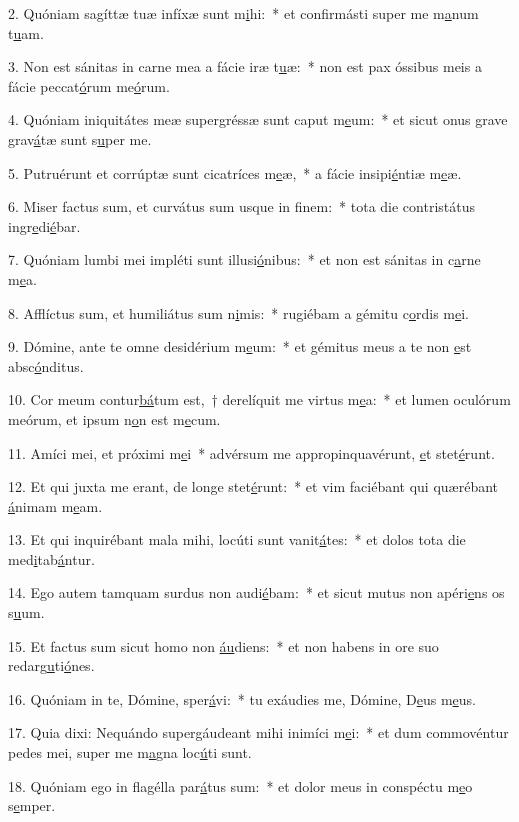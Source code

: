 2. Quóniam sagíttæ tuæ infíxæ sunt m\uline{i}hi:~* et confirmásti super me m\uline{a}num t\uline{u}am.\par 
3. Non est sánitas in carne mea a fácie iræ t\uline{u}æ:~* non est pax óssibus meis a fácie peccat\uline{ó}rum me\uline{ó}rum.\par 
4. Quóniam iniquitátes meæ supergréssæ sunt caput m\uline{e}um:~* et sicut onus grave grav\uline{á}tæ sunt s\uline{u}per me.\par 
5. Putruérunt et corrúptæ sunt cicatríces m\uline{e}æ,~* a fácie insipi\uline{é}ntiæ m\uline{e}æ.\par 
6. Miser factus sum, et curvátus sum usque in f\uline{i}nem:~* tota die contristátus ingr\uline{e}di\uline{é}bar.\par 
7. Quóniam lumbi mei impléti sunt illusi\uline{ó}nibus:~* et non est sánitas in c\uline{a}rne m\uline{e}a.\par 
8. Afflíctus sum, et humiliátus sum n\uline{i}mis:~* rugiébam a gémitu c\uline{o}rdis m\uline{e}i.\par 
9. Dómine, ante te omne desidérium m\uline{e}um:~* et gémitus meus a te non \uline{e}st absc\uline{ó}nditus.\par 
10. Cor meum contur\uline{bá}tum est,~† derelíquit me virtus m\uline{e}a:~* et lumen oculórum meórum, et ipsum n\uline{o}n est m\uline{e}cum.\par 
11. Amíci mei, et próximi m\uline{e}i~* advérsum me appropinquavérunt, \uline{e}t stet\uline{é}runt.\par 
12. Et qui juxta me erant, de longe stet\uline{é}runt:~* et vim faciébant qui quærébant \uline{á}nimam m\uline{e}am.\par 
13. Et qui inquirébant mala mihi, locúti sunt vanit\uline{á}tes:~* et dolos tota die med\uline{i}tab\uline{á}ntur.\par 
14. Ego autem tamquam surdus non audi\uline{é}bam:~* et sicut mutus non apéri\uline{e}ns os s\uline{u}um.\par 
15. Et factus sum sicut homo non \uline{áu}diens:~* et non habens in ore suo redarg\uline{u}ti\uline{ó}nes.\par 
16. Quóniam in te, Dómine, sper\uline{á}vi:~* tu exáudies me, Dómine, D\uline{e}us m\uline{e}us.\par 
17. Quia dixi: Nequándo supergáudeant mihi inimíci m\uline{e}i:~* et dum commovéntur pedes mei, super me m\uline{a}gna loc\uline{ú}ti sunt.\par 
18. Quóniam ego in flagélla par\uline{á}tus sum:~* et dolor meus in conspéctu m\uline{e}o s\uline{e}mper.\par 
